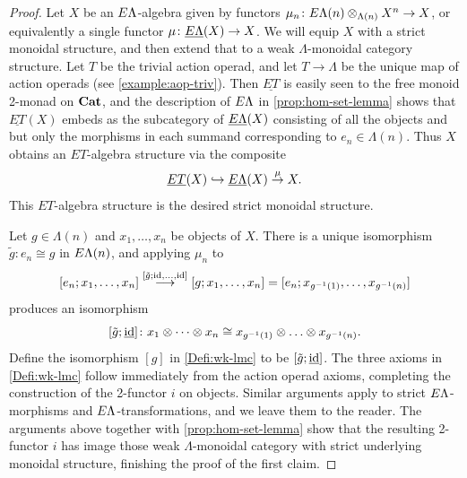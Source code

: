 \begin{proof}
Let $X$ be an $E\Lambda$-algebra given by functors $\mu_n \colon E\Lambda(n) \otimes_{\Lambda(n)} X^{n} \to X$, or equivalently a single functor $\mu \colon \underline{E\Lambda}(X) \to X$. 
We will equip $X$ with a strict monoidal structure, and then extend that to a weak $\Lambda$-monoidal category structure.
Let $T$ be the trivial action operad, and let $T \to \Lambda$ be the unique map of action operads (see \cref{example:aop-triv}). Then $\underline{ET}$ is easily seen to the free monoid 2-monad on $\mathbf{Cat}$, and the description of $E\Lambda$ in \cref{prop:hom-set-lemma} shows that $\underline{ET}(X)$ embeds as the subcategory of $\underline{E\Lambda}(X)$ consisting of all the objects and but only the morphisms in each summand corresponding to $e_n \in \Lambda(n)$. Thus $X$ obtains an $ET$-algebra structure via the composite
\[
\underline{ET}(X) \hookrightarrow \underline{E\Lambda}(X) \stackrel{\mu}{\to} X.
\]
This $ET$-algebra structure is the desired strict monoidal structure.

Let $g \in \Lambda(n)$ and $x_1, \ldots, x_n$ be objects of $X$. There is a unique isomorphism $\tilde{g} \colon e_n \cong g$ in $E\Lambda(n)$, and applying $\mu_n$ to 
\[
[e_n; x_1, \ldots, x_n] \stackrel{[\tilde{g}; \textrm{id}, \ldots, \textrm{id}]}{\longrightarrow} [g; x_1, \ldots, x_n] = [e_n; x_{g^{-1}(1)}, \ldots, x_{g^{-1}(n)}]
\]
produces an isomorphism 
\[
[\tilde{g}; \underline{\textrm{id}}] \colon x_1 \otimes \cdots \otimes x_n \cong x_{g^{-1}(1)} \otimes \ldots \otimes x_{g^{-1}(n)}.
\]
Define the isomorphism $[g]$ in \cref{Defi:wk-lmc} to be $[\tilde{g}; \underline{\textrm{id}}]$. The three axioms in \cref{Defi:wk-lmc} follow immediately from the action operad axioms, completing the construction of the 2-functor $i$ on objects. Similar arguments apply to strict $E\Lambda$-morphisms and $E\Lambda$-transformations, and we leave them to the reader. The arguments above together with \cref{prop:hom-set-lemma} show that the resulting 2-functor $i$ has image those weak $\Lambda$-monoidal category with strict underlying monoidal structure, finishing the proof of the first claim.


\end{proof}

